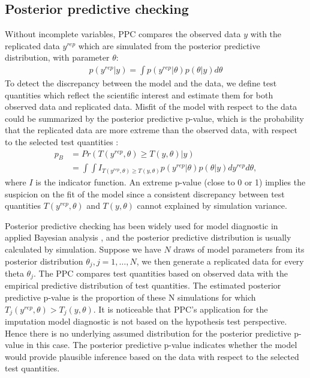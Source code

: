 	\subsection{Posterior predictive checking}
	Without incomplete variables, PPC compares the observed data $y$ with the replicated data $y^{rep}$ which are simulated from the posterior predictive distribution, with parameter $\theta$:
	\begin{equation}
		\begin{array}{ll}
			p(y^{rep}|y) = \int p(y^{rep}|\theta)p(\theta|y)d\theta
		\end{array} 
	\end{equation}
	To detect the discrepancy between the model and the data, we define test quantities which reflect the scientific interest and estimate them for both observed data and replicated data. Misfit of the model with respect to the data could be summarized by the posterior predictive p-value, which is the probability that the replicated data are more extreme than the observed data, with respect to the selected test quantities \citep{gelman2013bayesian}:
	\begin{equation}
		\begin{array}{ll}
			p_{B} &= Pr(T(y^{rep}, \theta) \ge T(y, \theta)|y)\\
			&= \int\int I_{T(y^{rep}, \theta) \ge T(y, \theta)}p(y^{rep}|\theta)p(\theta|y)dy^{rep}d\theta,
		\end{array} 
	\end{equation}
	where $I$ is the indicator function. An extreme p-value (close to 0 or 1) implies the suspicion on the fit of the model since a consistent discrepancy between test quantities $T(y^{rep}, \theta)$ and $T(y, \theta)$ cannot explained by simulation variance. 
	
	Posterior predictive checking has been widely used for model diagnostic in applied Bayesian analysis \citep[chapter 6]{gelman2013bayesian}, and the posterior predictive distribution is usually calculated by simulation. Suppose we have $N$ draws of model parameters from its posterior distribution $\theta_j, j=1,\dots,N$, we then generate a replicated data for every theta $\theta_j$. The PPC compares test quantities based on observed data with the empirical predictive distribution of test quantities. The estimated posterior predictive p-value is the proportion of these N simulations for which $T_{j}(y^{rep}, \theta) > T_{j}(y, \theta)$. It is noticeable that PPC's application for the imputation model diagnostic is not based on the hypothesis test perspective. Hence there is no underlying assumed distribution for the posterior predictive p-value in this case. The posterior predictive p-value indicates whether the model would provide plausible inference based on the data with respect to the selected test quantities. 
	
